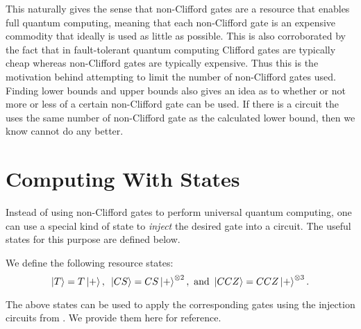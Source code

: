 \documentclass[12pt]{dalthesis}
\begin{document}
This naturally gives the sense that non-Clifford gates are a resource that enables full quantum computing, meaning that each non-Clifford gate is an expensive commodity that ideally is used as little as possible. This is also corroborated by the fact that in fault-tolerant quantum computing Clifford gates are typically cheap whereas non-Clifford gates are typically expensive. Thus this is the motivation behind attempting to limit the number of non-Clifford gates used. Finding lower bounds and upper bounds also gives an idea as to whether or not more or less of a certain non-Clifford gate can be used. If there is a circuit the uses the same number of non-Clifford gate as the calculated lower bound, then we know cannot do any better.

\section{Computing With States}
Instead of using non-Clifford gates to perform universal quantum computing, one can use a special kind of state to \emph{inject} the desired gate into a circuit. The useful states for this purpose are defined below.

\begin{definition}
We define the following resource states:
\begin{equation*}
\ket{T} = T\ket{+}, \mbox{ } \ket{CS} = CS \ket{+}^{\otimes 2}, \mbox{ and } \ket{CCZ} = CCZ \ket{+}^{\otimes 3}.
\end{equation*}
\end{definition}

The above states can be used to apply the corresponding gates using the injection circuits from \cite{beverland2019lower}. We provide them here for reference.
\end{document}
